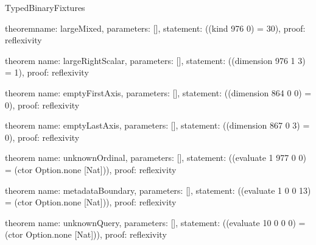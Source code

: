 \begin{lexlean}{TypedBinaryFixtures}
\begin{semanticmodule}
theorem{name: largeMixed, parameters: [], statement: ((kind 976 0) = 30), proof: reflexivity{}}

theorem{
  name: largeRightScalar,
  parameters: [],
  statement: ((dimension 976 1 3) = 1),
  proof: reflexivity{}
}

theorem{
  name: emptyFirstAxis,
  parameters: [],
  statement: ((dimension 864 0 0) = 0),
  proof: reflexivity{}
}

theorem{
  name: emptyLastAxis,
  parameters: [],
  statement: ((dimension 867 0 3) = 0),
  proof: reflexivity{}
}

theorem{
  name: unknownOrdinal,
  parameters: [],
  statement: ((evaluate 1 977 0 0) = (ctor Option.none [Nat])),
  proof: reflexivity{}
}

theorem{
  name: metadataBoundary,
  parameters: [],
  statement: ((evaluate 1 0 0 13) = (ctor Option.none [Nat])),
  proof: reflexivity{}
}

theorem{
  name: unknownQuery,
  parameters: [],
  statement: ((evaluate 10 0 0 0) = (ctor Option.none [Nat])),
  proof: reflexivity{}
}
\end{semanticmodule}
\end{lexlean}
